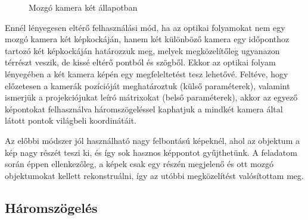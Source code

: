 \begin{figure}[tbh]
\caption{Mozgó kamera két állapotban \label{fig:triangulation}}
\end{figure}

Ennél lényegesen eltérő felhasználási mód, ha az optikai folyamokat nem egy mozgó kamera két képkockáján, hanem két különböző kamera egy időponthoz tartozó két képkockáján határozzuk meg, melyek megközelítőleg ugyanazon térrészt veszik, de kissé eltérő pontból és szögből. Ekkor az optikai folyam lényegében a két kamera képén egy megfeleltetést tesz lehetővé. Feltéve, hogy előzetesen a kamerák pozícióját meghatároztuk (külső paraméterek), valamint ismerjük a projekciójukat leíró mátrixokat (belső paraméterek), akkor az egyező képontokat felhasználva háromszögeléssel kaphatjuk a mindkét kamera által látott pontok világbeli koordinátáit.

Az előbbi módszer jól használható nagy felbontású képeknél, ahol az objektum a kép nagy részét teszi ki, és így sok hasznos képpontot gyűjthetünk. A feladatom során éppen ellenkezőleg, a képek csak egy részén megjelenő és ott mozgó objektumokat kellett rekonstruálni, így az utóbbi megközelítést valósítottam meg.


\subsection{Háromszögelés \label{sec:triangulation}}

